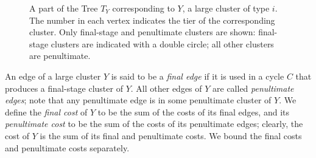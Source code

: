 \documentclass[11pt]{article}
\begin{document}
\begin{figure}[tbh]
  \begin{center}
  \end{center}
  \caption{A part of the Tree $T_Y$ corresponding to $Y$, a large
    cluster of type $i$. The number in each vertex indicates the tier
    of the corresponding cluster.  Only final-stage and penultimate
    clusters are shown: final-stage clusters are indicated with a
    double circle; all other clusters are penultimate.}
\end{figure}

An edge of a large cluster $Y$ is said to be a \emph{final edge} if it
is used in a cycle $C$ that produces a final-stage cluster of $Y$. All
other edges of $Y$ are called \emph{penultimate edges}; note that any
penultimate edge is in some penultimate cluster of $Y$. We define the
\emph{final cost} of $Y$ to be the sum of the costs of its final
edges, and its \emph{penultimate cost} to be the sum of the costs of
its penultimate edges; clearly, the cost of $Y$ is the sum of its
final and penultimate costs. We bound the final costs and penultimate
costs separately.
\end{document}
